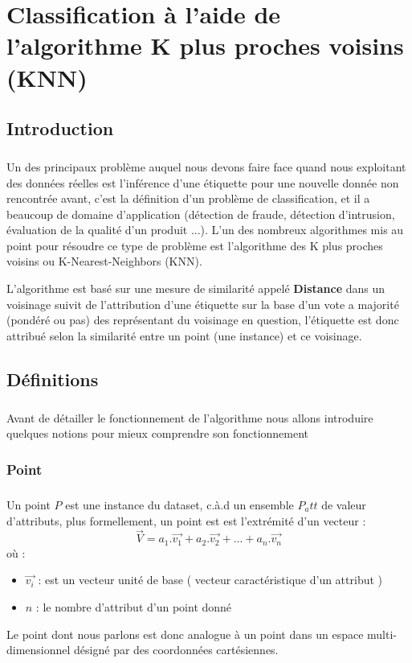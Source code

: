 \chapter{Classification à l'aide de l'algorithme K plus proches voisins (KNN)}
	\section{Introduction}
		\paragraph{}
		Un des principaux problème auquel nous devons faire face quand nous exploitant des données réelles est l'inférence d'une étiquette pour une nouvelle donnée non rencontrée avant, c'est la définition d'un problème de classification, et il a beaucoup de domaine d'application (détection de fraude, détection d'intrusion, évaluation de la qualité d'un produit ...). L'un des nombreux algorithmes mis au point pour résoudre ce type de problème est l'algorithme des K plus proches voisins ou K-Nearest-Neighbors (KNN).
		\par 
		 L'algorithme est basé sur une mesure de similarité appelé \textbf{Distance} dans un voisinage suivit de l'attribution d'une étiquette sur la base d'un vote a majorité (pondéré ou pas) des représentant du voisinage en question, l'étiquette est donc attribué selon la similarité entre un point (une instance) et ce voisinage.
	\newpage
	\section{Définitions}
		\paragraph{}
		Avant de détailler le fonctionnement de l'algorithme nous allons introduire quelques notions pour mieux comprendre son fonctionnement
		\subsection{Point}
			\paragraph{}
			Un point $P$ est une instance du dataset, c.à.d un ensemble $P_att$ de valeur d'attributs, plus formellement, un point est est l'extrémité d'un vecteur : \[\vec{V} = a_1.\vec{v_1} + a_2.\vec{v_2} + ... + a_n.\vec{v_n} \]
			où : 
			\begin{itemize}
				\item $\vec{v_i} $ : est un vecteur unité de base ( vecteur caractéristique d'un attribut )
				\item $n$ : le nombre d'attribut d'un point donné
			\end{itemize}
		Le point dont nous parlons est donc analogue à un point dans un espace multi-dimensionnel désigné par des coordonnées cartésiennes.
